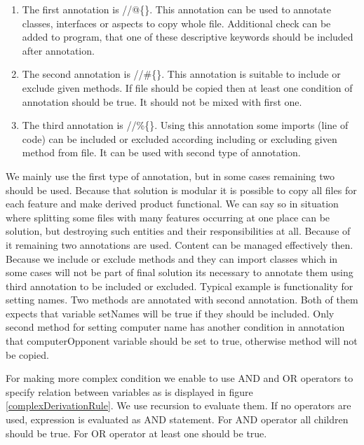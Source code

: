 \documentclass[11pt,english,a4paper,twoside]{article}
\begin{document}
\begin{enumerate}
	\item The first annotation is //@\{\}. This annotation can be used to annotate classes, interfaces or aspects to copy whole file. Additional check can be added to program, that one of these descriptive keywords should be included after annotation.

	\item The second annotation is //\#\{\}. This annotation is suitable to include or exclude given methods. If file should be copied then at least one condition of annotation should be true. It should not be mixed with first one. 

	\item The third annotation is //\%\{\}. Using this annotation some imports (line of code) can be included or excluded according including or excluding given method from file. It can be used with second type of annotation. 
\end{enumerate}


We mainly use the first type of annotation, but in some cases remaining two should be used. Because that solution is modular it is possible to copy all files for each feature and make derived product functional. We can say so in situation where splitting some files with many features occurring at one place can be solution, but destroying such entities and their responsibilities at all. Because of it remaining two annotations are used. Content can be managed effectively then. Because we include or exclude methods and they can import classes which in some cases will not be part of final solution its necessary to annotate them using third annotation to be included or excluded. Typical example is functionality for setting names. Two methods are annotated with second annotation. Both of them expects that variable setNames will be true if they should be included. Only second method for setting computer name has another condition in annotation that computerOpponent variable should be set to true, otherwise method will not be copied. 


For making more complex condition we enable to use AND and OR operators to specify relation between variables as is displayed in figure \ref{complexDerivationRule}. We use recursion to evaluate them. If no operators are used, expression is evaluated as AND statement. For AND operator all children should be true. For OR operator at least one should be true.
\end{document}
